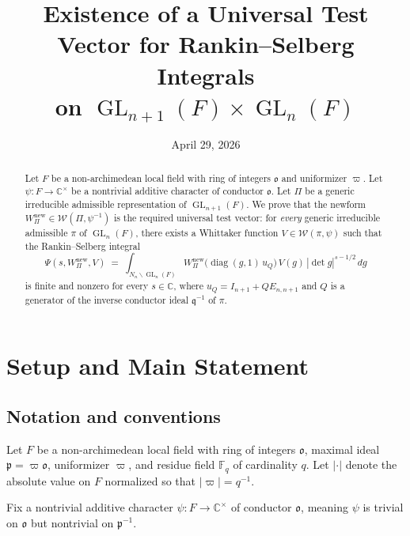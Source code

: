 \documentclass[12pt]{article}
\theoremstyle{definition}
\DeclareMathOperator{\GL}{GL}
\DeclareMathOperator{\diag}{diag}
\begin{document}
\title{Existence of a Universal Test Vector for Rankin--Selberg Integrals\\
on $\GL_{n+1}(F) \times \GL_n(F)$}
\author{}
\date{April 29, 2026}
\maketitle

\begin{abstract}
Let $F$ be a non-archimedean local field with ring of integers $\mathfrak{o}$
and uniformizer $\varpi$.  Let $\psi: F \to \mathbb{C}^\times$ be a nontrivial
additive character of conductor $\mathfrak{o}$.  Let $\Pi$ be a generic
irreducible admissible representation of $\GL_{n+1}(F)$.  We prove that the
newform $W_\Pi^{\mathrm{new}} \in \mathcal{W}(\Pi,\psi^{-1})$ is the required
universal test vector: for \emph{every} generic irreducible admissible $\pi$
of $\GL_n(F)$, there exists a Whittaker function $V \in \mathcal{W}(\pi,\psi)$
such that the Rankin--Selberg integral
\[
  \Psi(s, W_\Pi^{\mathrm{new}}, V)
  \;=\;
  \int_{N_n \backslash \GL_n(F)}
    W_\Pi^{\mathrm{new}}\!\bigl(\diag(g,1)\,u_Q\bigr)\,V(g)\,
    |\det g|^{s-1/2}\,dg
\]
is finite and nonzero for every $s \in \mathbb{C}$, where $u_Q = I_{n+1} + Q E_{n,n+1}$
and $Q$ is a generator of the inverse conductor ideal $\mathfrak{q}^{-1}$ of $\pi$.
\end{abstract}

\tableofcontents
\newpage

\section{Setup and Main Statement}

\subsection{Notation and conventions}

Let $F$ be a non-archimedean local field with ring of integers $\mathfrak{o}$,
maximal ideal $\mathfrak{p} = \varpi\mathfrak{o}$, uniformizer $\varpi$, and
residue field $\mathbb{F}_q$ of cardinality $q$.  Let $|\cdot|$ denote the
absolute value on $F$ normalized so that $|\varpi| = q^{-1}$.

Fix a nontrivial additive character $\psi: F \to \mathbb{C}^\times$ of
conductor $\mathfrak{o}$, meaning $\psi$ is trivial on $\mathfrak{o}$ but
nontrivial on $\mathfrak{p}^{-1}$.
\end{document}
